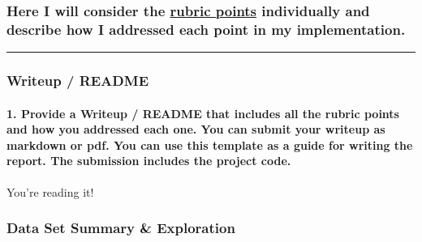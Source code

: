 \documentclass[11pt]{article}
\begin{document}
\hypertarget{here-i-will-consider-the-rubric-points-individually-and-describe-how-i-addressed-each-point-in-my-implementation.}{%
\subsubsection{\texorpdfstring{Here I will consider the
\href{https://review.udacity.com/\#!/rubrics/481/view}{rubric points}
individually and describe how I addressed each point in my
implementation.}{Here I will consider the rubric points individually and describe how I addressed each point in my implementation.}}\label{here-i-will-consider-the-rubric-points-individually-and-describe-how-i-addressed-each-point-in-my-implementation.}}

\begin{center}\rule{0.5\linewidth}{\linethickness}\end{center}

\hypertarget{writeup-readme}{%
\subsubsection{Writeup / README}\label{writeup-readme}}

\hypertarget{provide-a-writeup-readme-that-includes-all-the-rubric-points-and-how-you-addressed-each-one.-you-can-submit-your-writeup-as-markdown-or-pdf.-you-can-use-this-template-as-a-guide-for-writing-the-report.-the-submission-includes-the-project-code.}{%
\paragraph{1. Provide a Writeup / README that includes all the rubric
points and how you addressed each one. You can submit your writeup as
markdown or pdf. You can use this template as a guide for writing the
report. The submission includes the project
code.}\label{provide-a-writeup-readme-that-includes-all-the-rubric-points-and-how-you-addressed-each-one.-you-can-submit-your-writeup-as-markdown-or-pdf.-you-can-use-this-template-as-a-guide-for-writing-the-report.-the-submission-includes-the-project-code.}}

You're reading it!

\hypertarget{data-set-summary-exploration}{%
\subsubsection{Data Set Summary \&
Exploration}\label{data-set-summary-exploration}}
\end{document}
